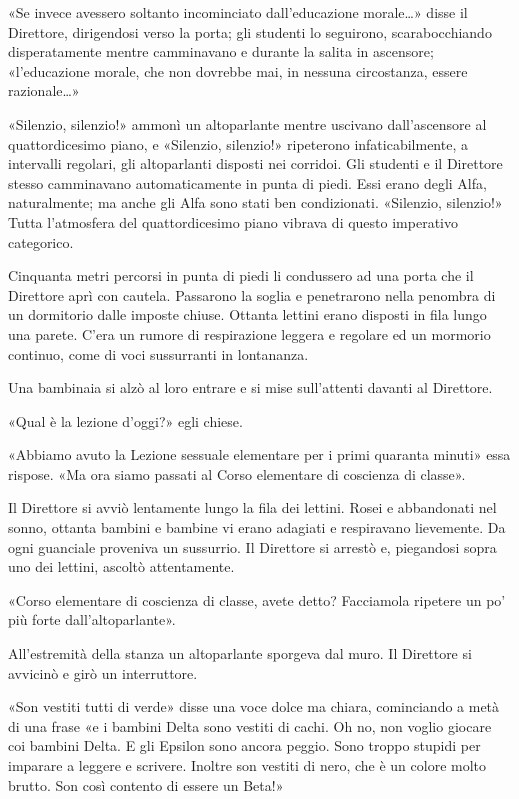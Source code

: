 \documentclass[
a5paper, %
10pt, %
twoside, 
onecolumn, %
openany, %
]{memoir}
\begin{document}
«Se invece avessero soltanto incominciato dall’educazione morale…» disse il Direttore, dirigendosi verso la porta; gli studenti lo seguirono, scarabocchiando disperatamente mentre camminavano e durante la salita in ascensore; «l’educazione morale, che non dovrebbe mai, in nessuna circostanza, essere razionale…»

«Silenzio, silenzio!» ammonì un altoparlante mentre uscivano dall’ascensore al quattordicesimo piano, e «Silenzio, silenzio!» ripeterono infaticabilmente, a intervalli regolari, gli altoparlanti disposti nei corridoi. Gli studenti e il Direttore stesso camminavano automaticamente in punta di piedi. Essi erano degli Alfa, naturalmente; ma anche gli Alfa sono stati ben condizionati. «Silenzio, silenzio!» Tutta l’atmosfera del quattordicesimo piano vibrava di questo imperativo categorico.

Cinquanta metri percorsi in punta di piedi li condussero ad una porta che il Direttore aprì con cautela. Passarono la soglia e penetrarono nella penombra di un dormitorio dalle imposte chiuse. Ottanta lettini erano disposti in fila lungo una parete. C’era un rumore di respirazione leggera e regolare ed un mormorio continuo, come di voci sussurranti in lontananza.

Una bambinaia si alzò al loro entrare e si mise sull’attenti davanti al Direttore.

«Qual è la lezione d’oggi?» egli chiese.

«Abbiamo avuto la Lezione sessuale elementare per i primi quaranta minuti» essa rispose. «Ma ora siamo passati al Corso elementare di coscienza di classe».

Il Direttore si avviò lentamente lungo la fila dei lettini. Rosei e abbandonati nel sonno, ottanta bambini e bambine vi erano adagiati e respiravano lievemente. Da ogni guanciale proveniva un sussurrio. Il Direttore si arrestò e, piegandosi sopra uno dei lettini, ascoltò attentamente.

«Corso elementare di coscienza di classe, avete detto? Facciamola ripetere un po’ più forte dall’altoparlante».

All’estremità della stanza un altoparlante sporgeva dal muro. Il Direttore si avvicinò e girò un interruttore.

«Son vestiti tutti di verde» disse una voce dolce ma chiara, cominciando a metà di una frase «e i bambini Delta sono vestiti di cachi. Oh no, non voglio giocare coi bambini Delta. E gli Epsilon sono ancora peggio. Sono troppo stupidi per imparare a leggere e scrivere. Inoltre son vestiti di nero, che è un colore molto brutto. Son così contento di essere un Beta!»
\end{document}
